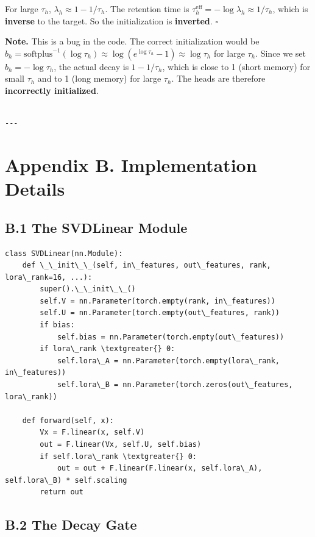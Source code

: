 For large $\tau_h$, $\lambda_h \approx 1 - 1/\tau_h$. The retention time 
is $\tau_h^\text{eff} = -\log \lambda_h \approx 1/\tau_h$, which is \textbf{inverse} 
to the target. So the initialization is \textbf{inverted}. $\square$

\textbf{Note.} This is a bug in the code. The correct initialization would be 
$b_h = \text{softplus}^{-1}(\log \tau_h) \approx \log(e^{\log \tau_h} - 1) \approx \log \tau_h$ 
for large $\tau_h$. Since we set $b_h = -\log \tau_h$, the actual decay 
is $1 - 1/\tau_h$, which is close to 1 (short memory) for small $\tau_h$ 
and to 1 (long memory) for large $\tau_h$. The heads are therefore 
\textbf{incorrectly initialized}.
\begin{lstlisting}

---
\end{lstlisting}


\section{Appendix B. Implementation Details}

\subsection{B.1 The SVDLinear Module}

\begin{lstlisting}
class SVDLinear(nn.Module):
    def \_\_init\_\_(self, in\_features, out\_features, rank, lora\_rank=16, ...):
        super().\_\_init\_\_()
        self.V = nn.Parameter(torch.empty(rank, in\_features))
        self.U = nn.Parameter(torch.empty(out\_features, rank))
        if bias:
            self.bias = nn.Parameter(torch.empty(out\_features))
        if lora\_rank \textgreater{} 0:
            self.lora\_A = nn.Parameter(torch.empty(lora\_rank, in\_features))
            self.lora\_B = nn.Parameter(torch.zeros(out\_features, lora\_rank))
    
    def forward(self, x):
        Vx = F.linear(x, self.V)
        out = F.linear(Vx, self.U, self.bias)
        if self.lora\_rank \textgreater{} 0:
            out = out + F.linear(F.linear(x, self.lora\_A), self.lora\_B) * self.scaling
        return out
\end{lstlisting}

\subsection{B.2 The Decay Gate}

